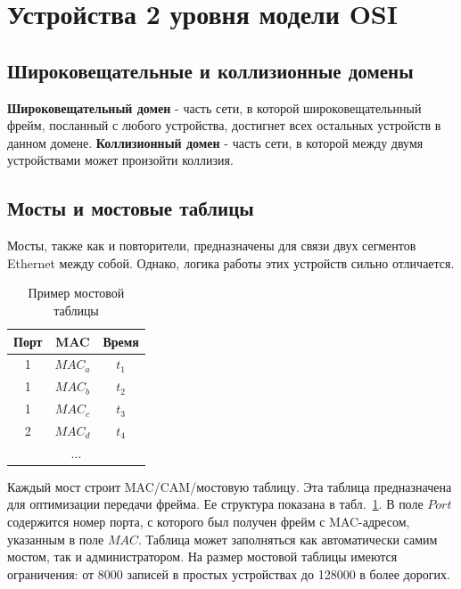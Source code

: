 \section{Устройства 2 уровня модели OSI}
\subsection{Широковещательные и коллизионные домены}
\textbf{Широковещательный домен} - часть сети, в которой широковещательнный фрейм, посланный с любого устройства, достигнет всех остальных устройств в данном домене.
\textbf{Коллизионный домен} - часть сети, в которой между двумя устройствами может произойти коллизия.
\subsection{Мосты и мостовые таблицы}
Мосты, также как и повторители, предназначены для связи двух сегментов Ethernet между собой. Однако, логика работы этих устройств сильно отличается.

\begin{table}[h!]
	\centering
	\begin{tabular}{|c|c|c|}
		\hline
		Порт & MAC & Время \\ \hline
		1 & $MAC_a$ & $t_1$ \\ \hline
		1 & $MAC_b$ & $t_2$ \\ \hline
		1 & $MAC_c$ & $t_3$ \\ \hline
		2 & $MAC_d$ & $t_4$ \\ \hline
		\multicolumn{3}{|c|}{...} \\ \hline
	\end{tabular}
	\caption{Пример мостовой таблицы}
	\label{tbl:cam_table}
\end{table}
Каждый мост строит MAC/CAM/мостовую таблицу. Эта таблица предназначена для оптимизации передачи фрейма. Ее структура показана в табл.~\ref{tbl:cam_table}. В поле $Port$ содержится номер порта, с которого был получен фрейм с MAC-адресом, указанным в поле $MAC$. Таблица может заполняться как автоматически самим мостом, так и администратором. На размер мостовой таблицы имеются ограничения: от 8000 записей в простых устройствах до 128000 в более дорогих.

